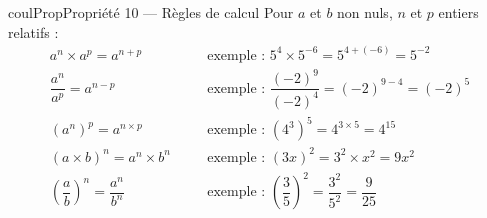 \documentclass[11pt,a4paper]{article}
\makeatletter
\newcounter{lycee@signet}
\newcommand{\signet}[3][]{\stepcounter{lycee@signet}%
  \edef\lycee@dest{\if\relax\detokenize{#1}\relax
    signet.\arabic{lycee@signet}\else#1\fi}%
  \hypertarget{\lycee@dest}{}\bookmark[level=#2,dest=\lycee@dest]{#3}}
\newenvironment{proprietebox}[1][Propriété]%
  {\begin{boitecours}[phantom={\signet{2}{#1}}]{coulProp}{#1}}{\end{boitecours}}
\makeatother
\begin{document}
\begin{proprietebox}[Propriété 10 --- Règles de calcul]
Pour $a$ et $b$ non nuls, $n$ et $p$ entiers relatifs :
\[
\renewcommand{\arraystretch}{2.2}
\begin{array}{lll}
  a^{n}\times a^{p}=a^{n+p} & \quad & \text{exemple : } 5^{4}\times 5^{-6}=5^{4+(-6)}=5^{-2}\\
  \dfrac{a^{n}}{a^{p}}=a^{n-p} & & \text{exemple : } \dfrac{(-2)^{9}}{(-2)^{4}}=(-2)^{9-4}=(-2)^{5}\\
  \left(a^{n}\right)^{p}=a^{n\times p} & & \text{exemple : } \left(4^{3}\right)^{5}=4^{3\times 5}=4^{15}\\
  (a\times b)^{n}=a^{n}\times b^{n} & & \text{exemple : } (3x)^{2}=3^{2}\times x^{2}=9x^{2}\\
  \left(\dfrac{a}{b}\right)^{n}=\dfrac{a^{n}}{b^{n}} & & \text{exemple : } \left(\dfrac{3}{5}\right)^{2}=\dfrac{3^{2}}{5^{2}}=\dfrac{9}{25}
\end{array}
\]
\end{proprietebox}
\end{document}
